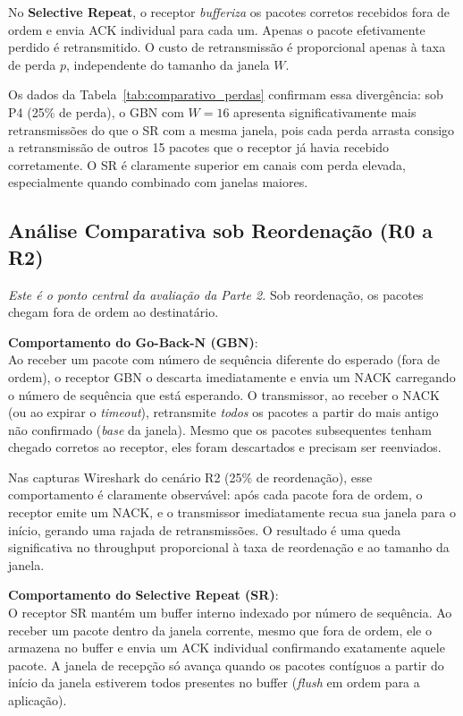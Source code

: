 \documentclass[12pt,a4paper]{article}
\begin{document}
No \textbf{Selective Repeat}, o receptor \emph{bufferiza} os pacotes corretos recebidos fora de ordem e envia ACK individual para cada um. Apenas o pacote efetivamente perdido é retransmitido. O custo de retransmissão é proporcional apenas à taxa de perda $p$, independente do tamanho da janela $W$.

Os dados da Tabela~\ref{tab:comparativo_perdas} confirmam essa divergência: sob P4 (25\% de perda), o GBN com $W = 16$ apresenta significativamente mais retransmissões do que o SR com a mesma janela, pois cada perda arrasta consigo a retransmissão de outros 15 pacotes que o receptor já havia recebido corretamente. O SR é claramente superior em canais com perda elevada, especialmente quando combinado com janelas maiores.

\subsection{Análise Comparativa sob Reordenação (R0 a R2)}
\textit{Este é o ponto central da avaliação da Parte 2.} Sob reordenação, os pacotes chegam fora de ordem ao destinatário.

\noindent \textbf{Comportamento do Go-Back-N (GBN)}:
\\
Ao receber um pacote com número de sequência diferente do esperado (fora de ordem), o receptor GBN o descarta imediatamente e envia um NACK carregando o número de sequência que está esperando. O transmissor, ao receber o NACK (ou ao expirar o \textit{timeout}), retransmite \emph{todos} os pacotes a partir do mais antigo não confirmado (\textit{base} da janela). Mesmo que os pacotes subsequentes tenham chegado corretos ao receptor, eles foram descartados e precisam ser reenviados.

Nas capturas Wireshark do cenário R2 (25\% de reordenação), esse comportamento é claramente observável: após cada pacote fora de ordem, o receptor emite um NACK, e o transmissor imediatamente recua sua janela para o início, gerando uma rajada de retransmissões. O resultado é uma queda significativa no throughput proporcional à taxa de reordenação e ao tamanho da janela.

\noindent \textbf{Comportamento do Selective Repeat (SR)}:
\\
O receptor SR mantém um buffer interno indexado por número de sequência. Ao receber um pacote dentro da janela corrente, mesmo que fora de ordem, ele o armazena no buffer e envia um ACK individual confirmando exatamente aquele pacote. A janela de recepção só avança quando os pacotes contíguos a partir do início da janela estiverem todos presentes no buffer (\textit{flush} em ordem para a aplicação).
\end{document}
